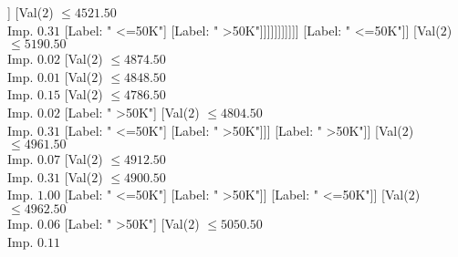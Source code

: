 \documentclass[margin=10pt]{standalone}
\begin{document}
\begin{forest}
																																												[Label: " >50K"]
																																												[Val($2$) $ \leq 4346.50$ \\ Imp. $0.06$
																																													[Label: " <=50K"]
																																													[Val($2$) $ \leq 4488.50$ \\ Imp. $0.04$
																																														[Val($2$) $ \leq 4481.50$ \\ Imp. $0.14$
																																															[Label: " <=50K"]
																																															[Label: " >50K"]]
																																														[Val($2$) $ \leq 4521.50$ \\ Imp. $0.31$
																																															[Label: " <=50K"]
																																															[Label: " >50K"]]]]]]]]]]]
																																					[Label: " <=50K"]]
																																				[Val($2$) $ \leq 5190.50$ \\ Imp. $0.02$
																																					[Val($2$) $ \leq 4874.50$ \\ Imp. $0.01$
																																						[Val($2$) $ \leq 4848.50$ \\ Imp. $0.15$
																																							[Val($2$) $ \leq 4786.50$ \\ Imp. $0.02$
																																								[Label: " >50K"]
																																								[Val($2$) $ \leq 4804.50$ \\ Imp. $0.31$
																																									[Label: " <=50K"]
																																									[Label: " >50K"]]]
																																							[Label: " >50K"]]
																																						[Val($2$) $ \leq 4961.50$ \\ Imp. $0.07$
																																							[Val($2$) $ \leq 4912.50$ \\ Imp. $0.31$
																																								[Val($2$) $ \leq 4900.50$ \\ Imp. $1.00$
																																									[Label: " <=50K"]
																																									[Label: " >50K"]]
																																								[Label: " <=50K"]]
																																							[Val($2$) $ \leq 4962.50$ \\ Imp. $0.06$
																																								[Label: " >50K"]
																																								[Val($2$) $ \leq 5050.50$ \\ Imp. $0.11$

\end{forest}
\end{document}
